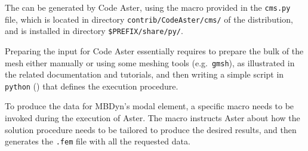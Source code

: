 The  can be generated by Code Aster, using
the macro provided in the \texttt{cms.py} file, 
which is located in directory \texttt{contrib/CodeAster/cms/} 
of the distribution, and is installed in directory
\texttt{\$PREFIX/share/py/}.

Preparing the input for Code Aster essentially requires to prepare
the bulk of the mesh either manually or using some meshing tools
(e.g.\ \texttt{gmsh}), as illustrated in the related documentation
and tutorials, and then writing a simple script in \texttt{python}
()
that defines the execution procedure.

To produce the data for MBDyn's modal element, a specific macro 
needs to be invoked during the execution of Aster.
The macro instructs Aster about how the solution procedure
needs to be tailored to produce the desired results, and then
generates the \texttt{.fem} file with all the requested data.


